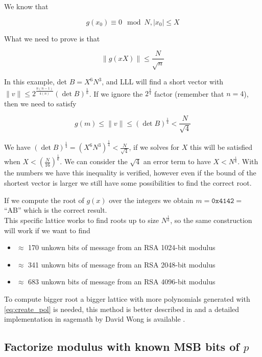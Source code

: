 \documentclass[a4paper,12pt]{report}
\begin{document}
We know that

\[
    g(x_0) \equiv 0 \mod N, |x_0| \le X
\]

What we need to prove is that

\[
    \lVert g(xX) \rVert \le \frac{N}{\sqrt{n}}
\] 

In this example, det $B = X^6N^3$, and LLL will find a short vector with $\lVert v \rVert \le 2^{\frac{n(n-1)}{4(n)}} (\det B)^{\frac{1}{n}}$.
If we ignore the $2^{\frac{3}{4}}$ factor (remember that $n = 4$), then we need to satisfy

\[
    g(m) \le \lVert v \rVert \le (\det B)^{\frac{1}{4}} < \frac{N}{\sqrt{4}}
\] 

\vspace*{10px}

We have $(\det B)^{\frac{1}{4}} = (X^6N^3)^{\frac{1}{4}} < \frac{N}{\sqrt{4}}$, if we solves for $X$ this will be satisfied when
$X < (\frac{N}{16})^{\frac{1}{6}}$. We can consider the $\sqrt{4}$ an error term to have $X < N^{\frac{1}{6}}$.
With the numbers we have this inequality is verified, however even if the bound of the shortest vector is larger we still have some possibilities to
find the correct root.

If we compute the root of $g(x)$ over the integers we obtain $m = \texttt{0x4142} = $ ``AB'' which is the correct result.\\

This specific lattice works to find roots up to size $N^{\frac{1}{6}}$, so the same construction will work if we want to find

\begin{itemize}
    \item $\approx$ 170 unkown bits of message from an RSA 1024-bit modulus
    \item $\approx$ 341 unkown bits of message from an RSA 2048-bit modulus
    \item $\approx$ 683 unkown bits of message from an RSA 4096-bit modulus
\end{itemize}

To compute bigger root a bigger lattice with more polynomials generated with \ref{eq:create_pol} is needed,
this method is better described in \cite{may2011} and a detailed implementation in sagemath by David Wong is available \cite{wong2015}.

\subsection{Factorize modulus with known MSB bits of $p$}
\end{document}
